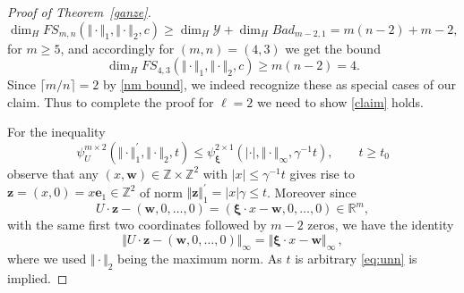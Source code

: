 \documentclass[10pt]{amsart}
\theoremstyle{definition}
\newcommand{\ux}{\boldsymbol{\xi}}
\newcommand{\ee}{\boldsymbol{e}}
\newcommand{\R}{\mathbb{R}}
\newcommand{\Z}{\mathbb{Z}}
\begin{document}
\begin{proof}[Proof of Theorem~\ref{ganze}]
    \begin{equation*}
        \dim_H FS_{m,n}(\Vert\cdot\Vert_{1},\Vert\cdot\Vert_{2},c) \geq \dim_H \mathcal{Y} + \dim_H Bad_{m-2,1} = m(n-2) + m-2, 
    \end{equation*}
    for $m\ge 5$, and accordingly for $(m,n)=(4,3)$ we get the bound 
    \[
    \dim_H FS_{4,3}(\Vert\cdot\Vert_{1},\Vert\cdot\Vert_{2},c) \geq
    m(n-2)=4.
    \]
    Since $\lceil m/n\rceil=2$ by \eqref{nm bound}, we indeed recognize these as special cases
    of our claim.
    Thus to complete the proof for $\ell=2$ we need to show \eqref{claim} holds.
    
    For the inequality
    \begin{equation} \label{eq:unn}
    \psi_U^{m\times 2}(\Vert\cdot\Vert_1^{\prime}, \Vert\cdot\Vert_2,t) \le \psi_{\ux}^{2\times 1}(|\cdot |,\Vert \cdot\Vert_{\infty},\gamma^{-1} t), \qquad t\geq t_{0}
    \end{equation}
    observe that any $(x,\boldsymbol{w})\in \Z\times \Z^2$ with $| x\vert\le \gamma^{-1} t$ gives rise to
    $\boldsymbol{z}=(x,0)=x \ee_1\in \Z^2$ of norm $\Vert \boldsymbol{z} \Vert_1^{\prime}= |x|\gamma\le t$. Moreover since
      \begin{equation} \label{eq:noon}
    U\cdot \boldsymbol{z}-(\boldsymbol{w},0,\ldots,0)= (\ux\cdot x - \boldsymbol{w} , 0, \ldots,0)\in\R^m,
    \end{equation}
    with the same first two coordinates
    followed by $m-2$ zeros, we have the identity
    \begin{equation}  \label{eq:spet}
        \Vert U\cdot \boldsymbol{z}-(\boldsymbol{w},0,\ldots,0)\Vert_{\infty}=  \Vert\ux\cdot x-\boldsymbol{w}\Vert_{\infty}\, ,
    \end{equation}
   where we used $\Vert\cdot\Vert_2$ being the maximum norm. As $t$ is arbitrary \eqref{eq:unn} is implied.


\end{proof}
\end{document}
